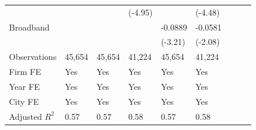 \begin{table}[htbp]
\begin{tabularx}{\textwidth}{lYYYYYYYY@{}}
                &                  &                  &  (-4.95)         &                  &  (-4.48)         \\
Broadband       &                  &                  &                  &  -0.0889\sym{***}&  -0.0581\sym{**} \\
                &                  &                  &                  &  (-3.21)         &  (-2.08)         \\
\hline
Observations    &   45,654         &   45,654         &   41,224         &   45,654         &   41,224         \\
Firm FE         &      Yes         &      Yes         &      Yes         &      Yes         &      Yes         \\
Year FE         &      Yes         &      Yes         &      Yes         &      Yes         &      Yes         \\
City FE         &      Yes         &      Yes         &      Yes         &      Yes         &      Yes         \\
Adjusted $ R^2$ &     0.57         &     0.57         &     0.58         &     0.57         &     0.58         \\
\bottomrule
\end{tabularx}
\end{table}
